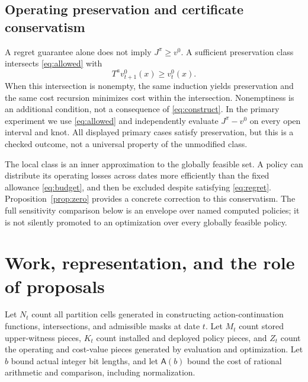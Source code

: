 \subsection{Operating preservation and certificate conservatism}
A regret guarantee alone does not imply $J^\pi\ge v^0$. A sufficient preservation class intersects \eqref{eq:allowed} with
\begin{equation}\label{eq:preserve}
 T^a v_{t+1}^0(x)\ge v_t^0(x).
\end{equation}
When this intersection is nonempty, the same induction yields preservation and the same cost recursion minimizes cost within the intersection. Nonemptiness is an additional condition, not a consequence of \eqref{eq:construct}. In the primary experiment we use \eqref{eq:allowed} and independently evaluate $J^\pi-v^0$ on every open interval and knot. All displayed primary cases satisfy preservation, but this is a checked outcome, not a universal property of the unmodified class.

The local class is an inner approximation to the globally feasible set. A policy can distribute its operating losses across dates more efficiently than the fixed allowance \eqref{eq:budget}, and then be excluded despite satisfying \eqref{eq:regret}. Proposition~\ref{prop:zero} provides a concrete correction to this conservatism. The full sensitivity comparison below is an envelope over named computed policies; it is not silently promoted to an optimization over every globally feasible policy.

\section{Work, representation, and the role of proposals}\label{sec:work}
Let $N_t$ count all partition cells generated in constructing action-continuation functions, intersections, and admissible masks at date $t$. Let $M_t$ count stored upper-witness pieces, $K_t$ count installed and deployed policy pieces, and $Z_t$ count the operating and cost-value pieces generated by evaluation and optimization. Let $b$ bound actual integer bit lengths, and let $\mathsf A(b)$ bound the cost of rational arithmetic and comparison, including normalization.


